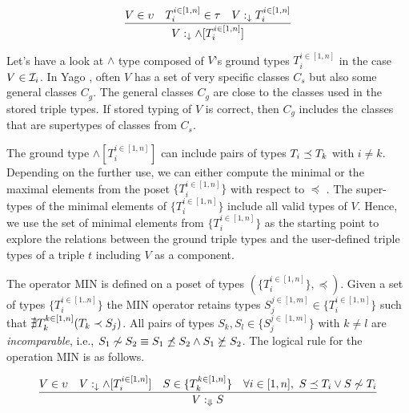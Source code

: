 \documentclass[runningheads]{llncs}
\newcommand{\darr}{\downarrow}
\newcommand{\Darr}{\Downarrow}
\newcommand{\I}{{\cal I}}
\newcommand{\memo}[1]{}
\begin{document}
\begin{equation}
\label{rul:land-1}
\dfrac{V\in\upsilon\quad\/T_i^{i\in[1,n]}\in\tau\quad\/V:_{\darr}T_i^{i\in[1,n]}}
      {V:_{\darr}\land[T_i^{i\in[1,n]}]}
\end{equation}

Let's have a look at $\land$ type composed of $V$'s ground types
$T_i^{i\in[1,n]}$ in the case $V\in\I_i$. In Yago \cite{Hoffart2013},
often $V$ has a set of very specific classes $C_s$ but also some
general classes $C_g$. The general classes $C_g$ are close to the
classes used in the stored triple types. If stored typing of $V$ is
correct, then $C_g$ includes the classes that are supertypes of
classes from $C_s$.

The ground type $\land[T_i^{i\in[1,n]}]$ can include pairs of types
$T_i\preceq\/T_k$ with $i\not=k$. Depending on the further use, we can
either compute the minimal or the maximal elements from the poset
$\{T_i^{i\in[1,n]}\}$ with respect to $\preceq$
\cite{DaveyPriestley2002}. The super-types of the minimal elements of
$\{T_i^{i\in[1,n]}\}$ include all valid types of $V$. Hence, we use
the set of minimal elements from $\{T_i^{i\in[1,n]}\}$ as the starting
point to explore the relations between the ground triple types and the
user-defined triple types of a triple $t$ including $V$ as a
component.

\memo{the type $\land[T_i^{i\in[1,n]}]$ It makes sense
either to compute MIN or MAX of $\land[T_i^{i\in[1,n]}]$ yielding
$\land[S_1..S_m]$ where $m\le\/n$ and
$S_j^{j\in[1,m]}\in\{T_i^{i\in[1,n]}\}$. The operator MIN computes
$S_j^{j\in[1,m]}$ such that each $S_j$ is minimal among
$T_i^{i\in[1,n]}$. The operator MAX computes $S_j^{j\in[1,m]}$ such
that each $S_j$ is maximal among $T_i^{i\in[1,n]}$. Note that in both
cases there are no pairs among $S_j^{j\in[1,m]}$ related by $\preceq$.}

The operator MIN is defined on a poset of types
$(\{T_i^{i\in[1,n]}\},\preceq)$. Given a set of types $\{T_i^{i\in[1..n]}\}$
the MIN operator retains types $S_j^{j\in[1,m]}\in\{T_i^{i\in[1,n]}\}$
such that ${\nexists}\/T_k^{k\in[1,n]}(T_k\prec\/S_j)$. All pairs of
types $S_k,S_l\in\{S_j^{j\in[1,m]}\}$ with $k\not=l$ are
\emph{incomparable}, i.e.,
$S_1\not\sim\/S_2\equiv\/S_1\not\preceq\/S_2\land\/S_1\not\succeq\/S_2$.
The logical rule for the operation MIN is as follows.

\begin{equation}
\label{rul:min}
\dfrac{V\in\upsilon\quad\/V:_\darr\land[T_i^{i\in[1,n]}]\quad\/S\in\/\{T_k^{k\in[1,n]}\}\quad\forall\/i\in[1,n],\ S\preceq\/T_i\lor\/S\not\sim\/T_i}
      {V:_{\Darr}S}
\end{equation}
\end{document}
